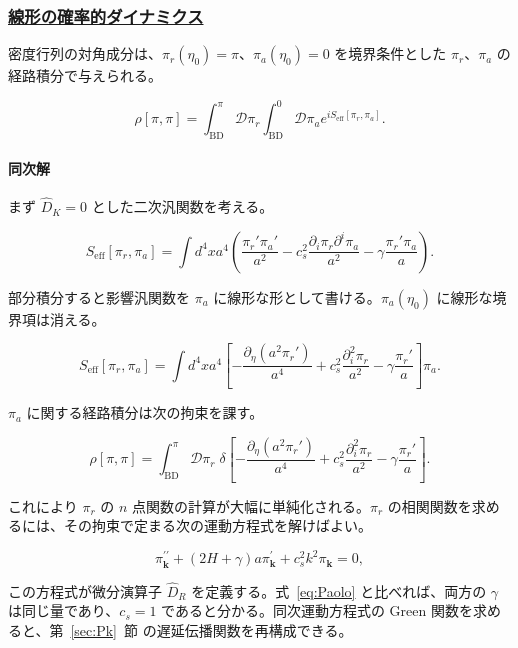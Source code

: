 \documentclass[a4paper,11pt]{ltjsarticle}
\numberwithin{equation}{section}
\newcommand{\subsubsectionlink}[1]{\subsubsection[#1]{\hyperlink{toc}{#1}}}
\def\pia{\pi_{a}}
\def\pir{\pi_{r}}
\def\bfk{\textbf{k}}
\newcommand{\Eq}[1]{Eq.~(\ref{#1})}
\newcommand{\Sec}[1]{Sec.~\ref{#1}}
\renewcommand{\Eq}[1]{式~\eqref{#1}}
\renewcommand{\Sec}[1]{第~\ref{#1}~節}
\begin{document}
\subsubsectionlink{線形の確率的ダイナミクス}

密度行列の対角成分は、$\pir(\eta_0)=\pi$、$\pia(\eta_0)=0$ を境界条件とした $\pir$、$\pia$ の経路積分で与えられる。

\begin{equation}
    \rho[\pi,\pi]=\int_{\text{BD}}^{\pi}\mathcal{D}\pir\int_{\text{BD}}^{0}\mathcal{D}\pia e^{iS_{\text{eff}}[\pir,\pia]}.
\end{equation}

\paragraph{同次解} まず $\widehat D_K=0$ とした二次汎関数を考える。

\begin{equation}\label{eq:noiselessfree}
    S_{\text{eff}}[\pir,\pia] =  \int d^{4}x a^{4}\left(\frac{\pir'\pia'}{a^{2}} - c_{s}^{2}  \frac{\partial_i \pir  \partial^i \pia}{a^{2}} -   \gamma  \frac{\pir' \pia }{a}\right).
 \end{equation}

部分積分すると影響汎関数を $\pia$ に線形な形として書ける。$\pia(\eta_0)$ に線形な境界項は消える。

\begin{equation}
    S_{\text{eff}}[\pir,\pia] =  \int d^{4}x a^{4}\left[ - \frac{\partial_{\eta}\left(a^{2}\pir'\right)}{a^{4}} + c_{s}^{2}  \frac{\partial_i^{2} \pir}{a^{2}} -   \gamma  \frac{\pir'}{a}\right] \pia.
\end{equation}

$\pia$ に関する経路積分は次の拘束を課す。

\begin{equation}
    \rho[\pi,\pi]=\int_{\text{BD}}^{\pi}\mathcal{D}\pir\;\delta\left[ - \frac{\partial_{\eta}\left(a^{2}\pir'\right)}{a^{4}} + c_{s}^{2}  \frac{\partial_i^{2} \pir}{a^{2}} -   \gamma  \frac{\pir'}{a}\right].
\end{equation}

これにより $\pir$ の $n$ 点関数の計算が大幅に単純化される。$\pir$ の相関関数を求めるには、その拘束で定まる次の運動方程式を解けばよい。

\begin{equation}
    \pi_{\bfk}^{\prime \prime} + \left( 2H + \gamma\right)a \pi_{\bfk}^{\prime}+c_{s}^{2}k^{2}\pi_{\bfk}=0,
\end{equation}

この方程式が微分演算子 $\widehat D_R$ を定義する。\Eq{eq:Paolo} と比べれば、両方の $\gamma$ は同じ量であり、$c_s=1$ であると分かる。同次運動方程式の Green 関数を求めると、\Sec{sec:Pk} の遅延伝播関数を再構成できる。
\end{document}
